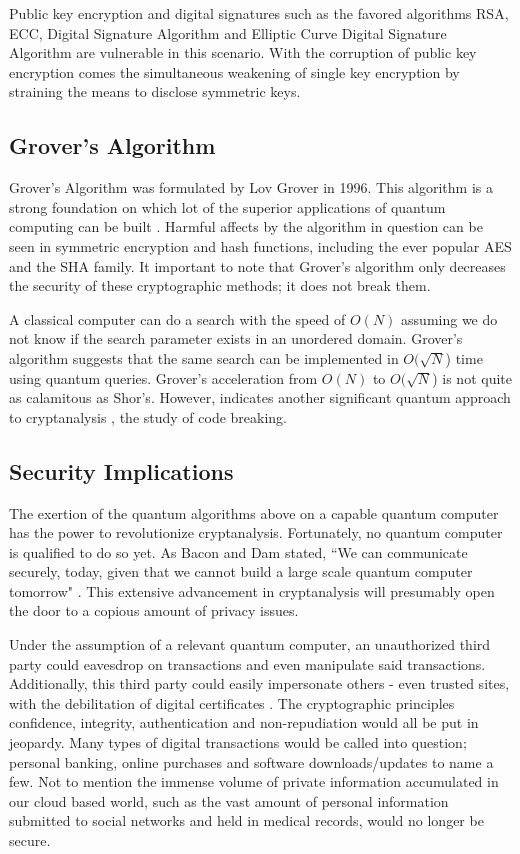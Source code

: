 Public key encryption and digital signatures such as the favored algorithms RSA, ECC, Digital Signature Algorithm and Elliptic Curve Digital Signature Algorithm are vulnerable in this scenario. With the corruption of public key encryption comes the simultaneous weakening of single key encryption by straining the means to disclose symmetric keys.

\subsection{Grover's Algorithm}
Grover's Algorithm was formulated by Lov Grover in 1996. This algorithm is a strong foundation on which lot of the superior applications of quantum computing can be built \cite{Post_Q_Cryptog}. Harmful affects by the algorithm in question can be seen in symmetric encryption and hash functions, including the ever popular AES and the SHA family. It important to note that Grover's algorithm only decreases the security of these cryptographic methods; it does not break them.

A classical computer can do a search with the speed of \(O(N)\) assuming we do not know if the search parameter exists in an unordered domain. Grover's algorithm suggests that the same search can be implemented in \(O(\sqrt{N}\)) time using quantum queries. Grover's acceleration from \(O(N)\) to \(O(\sqrt{N}\)) is not quite as calamitous as Shor's. However, indicates another significant quantum approach to cryptanalysis \cite{Quantum_Cryptanal}, the study of code breaking. 

\subsection{Security Implications}
The exertion of the quantum algorithms above on a capable quantum computer has the power to revolutionize cryptanalysis. Fortunately, no quantum computer is qualified to do so yet. As Bacon and Dam stated, ``We can communicate securely, today, given that we cannot build a large scale quantum computer tomorrow" \cite{Q_Alg}. This extensive advancement in cryptanalysis will presumably open the door to a copious amount of privacy issues. 

Under the assumption of a relevant quantum computer, an unauthorized third party could eavesdrop on transactions and even manipulate said transactions. Additionally, this third party could easily impersonate others - even trusted sites, with the debilitation of digital certificates \cite{Sec_Risk}. The cryptographic principles confidence, integrity, authentication and non-repudiation would all be put in jeopardy. Many types of digital transactions would be called into question; personal banking, online purchases and software downloads/updates to name a few. Not to mention the immense volume of private information accumulated in our cloud based world, such as the vast amount of personal information submitted to social networks and held in medical records, would no longer be secure. 

